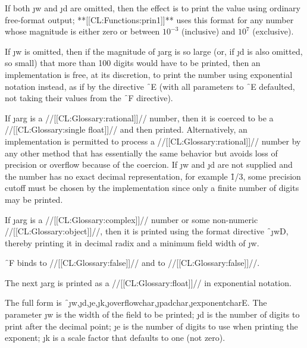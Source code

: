 If both \j{w} and \j{d} are omitted, then the effect is to print
the value using ordinary free-format output; **[[CL:Functions:prin1]]** uses this format
for any number whose magnitude is either zero or between
$10^{-3}$ (inclusive) and $10^7$ (exclusive).


If \j{w} is omitted, then if the magnitude of \j{arg} is so large (or, if
\j{d} is also omitted, so small) that more than 100 digits would have to
be printed, then an implementation is free, at its discretion, to print
the number using exponential notation instead, as if by the directive
\f{~E} (with all parameters to \f{~E} defaulted, not
taking their values from the \f{~F} directive).


If \j{arg} is a //[[CL:Glossary:rational]]// 
number, then it is coerced to be a //[[CL:Glossary:single float]]//
and then printed.  Alternatively, an implementation is permitted to
process a //[[CL:Glossary:rational]]// 
number by any other method that has essentially the
same behavior but avoids loss of precision or overflow
because of the coercion.  If \j{w} and \j{d} are
not supplied and the number has no exact decimal representation,
for example \f{1/3}, some precision cutoff must be chosen
by the implementation since only a finite number of digits may be printed.


If \j{arg} is a //[[CL:Glossary:complex]]// number or some non-numeric
//[[CL:Glossary:object]]//, 
then it is printed using the format directive \f{~\j{w}D},
thereby printing it in decimal radix and a minimum field width of \j{w}.

\f{~F} binds
     to //[[CL:Glossary:false]]//
 and  to //[[CL:Glossary:false]]//.



\endsubsubsection%




The next \j{arg} is printed as a //[[CL:Glossary:float]]// in exponential notation.


The full form is
\f{~\j{w},\j{d},\j{e},\j{k},\j{overflowchar},\j{padchar},\j{exponentchar}E}.
The parameter \j{w}
is the width of the field to be printed; \j{d} is the number
of digits to print after the decimal point; \j{e} is the number
of digits to use when printing the exponent;
\j{k} is a scale factor that defaults to one (not zero).


